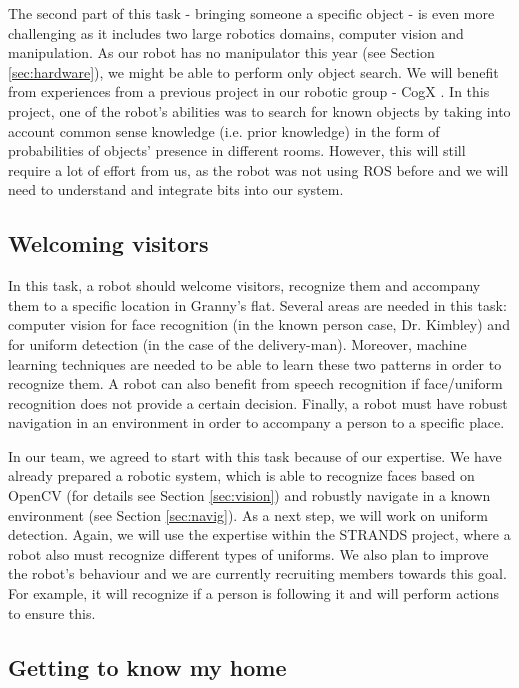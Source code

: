 \documentclass[conference]{IEEEtran}
\begin{document}
The second part of this task - bringing someone a specific object - is even more challenging as it includes two large robotics domains, computer vision and manipulation. As our robot has no manipulator this year (see Section \ref{sec:hardware}), we might be able to perform only object search. We will benefit from experiences from a previous project in our robotic group - CogX \cite{cogx}. In this project, one of the robot's abilities was to search for known objects by taking into account common sense knowledge (i.e. prior knowledge) in the form of probabilities of objects' presence in different rooms. However, this will still require a lot of effort from us, as the robot was not using ROS before and we will need to understand and integrate bits into our system. 

\subsection{Welcoming visitors}

In this task, a robot should welcome visitors, recognize them and accompany them to a specific location in Granny's flat. Several areas are needed in this task: computer vision for face recognition (in the known person case, Dr. Kimbley) and for uniform detection (in the case of the delivery-man). Moreover, machine learning techniques are needed to be able to learn these two patterns in order to recognize them. A robot can also benefit from speech recognition if face/uniform recognition does not provide a certain decision. Finally, a robot must have robust navigation in an environment in order to accompany a person to a specific place. 

In our team, we agreed to start with this task because of our expertise. We have already prepared a robotic system, which is able to recognize faces based on OpenCV (for details see Section \ref{sec:vision}) and robustly navigate in a known environment (see Section \ref{sec:navig}). As a next step, we will work on uniform detection. Again, we will use the expertise within the STRANDS project, where a robot also must recognize different types of uniforms. We also plan to improve the robot's behaviour and we are currently recruiting members towards this goal. For example, it will recognize if a person is following it and will perform actions to ensure this.

\subsection{Getting to know my home}
\end{document}

